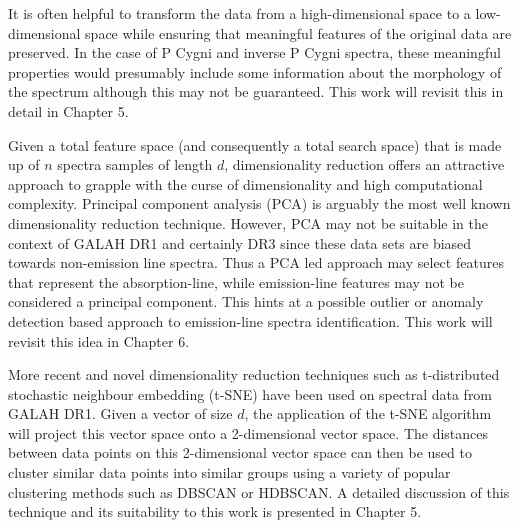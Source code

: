 It is often helpful to transform the data from a high-dimensional space to a low-dimensional space while ensuring that meaningful features of the original data are preserved. In the case of P Cygni and inverse P Cygni spectra, these meaningful properties would presumably include some information about the morphology of the spectrum although this may not be guaranteed. This work will revisit this in detail in Chapter 5.

Given a total feature space (and consequently a total search space) that is made up of $n$ spectra samples of length $d$, dimensionality reduction offers an attractive approach to grapple with the curse of dimensionality and high computational complexity. Principal component analysis (PCA) is arguably the most well known dimensionality reduction technique. However, PCA may not be suitable in the context of GALAH DR1 and certainly DR3 since these data sets are biased towards non-emission line spectra. Thus a PCA led approach may select features that represent the absorption-line, while emission-line features may not be considered a principal component. This hints at a possible outlier or anomaly detection based approach to emission-line spectra identification. This work will revisit this idea in Chapter 6.

More recent and novel dimensionality reduction techniques such as t-distributed stochastic neighbour embedding (t-SNE)\cite{van2008visualizing} have been used on spectral data from GALAH DR1\cite{traven2017galah}. Given a vector of size $d$, the application of the t-SNE algorithm will project this vector space onto a 2-dimensional vector space. The distances between data points on this 2-dimensional vector space can then be used to cluster similar data points into similar groups using a variety of popular clustering methods such as DBSCAN\cite{ester1996density} or HDBSCAN\cite{campello2013density}. A detailed discussion of this technique and its suitability to this work is presented in Chapter 5.


